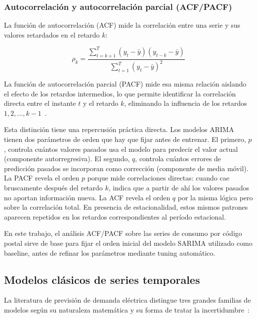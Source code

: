 \documentclass[12pt, a4paper]{article}
\begin{document}
\subsubsection{Autocorrelación y autocorrelación parcial (ACF/PACF)}

La función de autocorrelación (ACF) mide la correlación entre una serie y sus valores retardados en el retardo $k$:

\begin{equation}
\rho_k = \frac{\sum_{t=k+1}^{T}(y_t - \bar{y})(y_{t-k} - \bar{y})}{\sum_{t=1}^{T}(y_t - \bar{y})^2}
\end{equation}

La función de autocorrelación parcial (PACF) mide esa misma relación aislando el efecto de los retardos intermedios, lo que permite identificar la correlación directa entre el instante $t$ y el retardo $k$, eliminando la influencia de los retardos $1, 2, \ldots, k-1$~\cite{hyndman2021}.

Esta distinción tiene una repercusión práctica directa. Los modelos ARIMA tienen dos parámetros de orden que hay que fijar antes de entrenar. El primero, $p$, controla cuántos valores pasados usa el modelo para predecir el valor actual (componente autorregresiva). El segundo, $q$, controla cuántos errores de predicción pasados se incorporan como corrección (componente de media móvil). La PACF revela el orden $p$ porque mide correlaciones directas: cuando cae bruscamente después del retardo $k$, indica que a partir de ahí los valores pasados no aportan información nueva. La ACF revela el orden $q$ por la misma lógica pero sobre la correlación total. En presencia de estacionalidad, estos mismos patrones aparecen repetidos en los retardos correspondientes al período estacional.

En este trabajo, el análisis ACF/PACF sobre las series de consumo por código postal sirve de base para fijar el orden inicial del modelo SARIMA utilizado como baseline, antes de refinar los parámetros mediante tuning automático.

\subsection{Modelos clásicos de series temporales}

La literatura de previsión de demanda eléctrica distingue tres grandes familias de modelos según su naturaleza matemática y su forma de tratar la incertidumbre~\cite{eke2025}:
\end{document}
